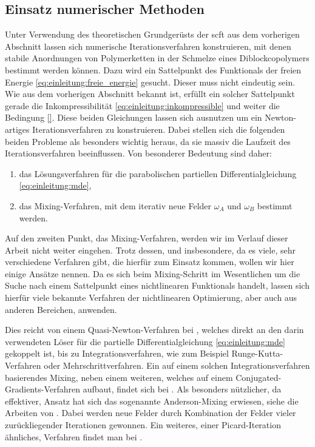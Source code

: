 \subsection*{Einsatz numerischer Methoden} %

Unter Verwendung des theoretischen Grundgerüsts der \ac{scft} aus dem vorherigen Abschnitt lassen sich numerische Iterationsverfahren konstruieren, mit denen stabile Anordnungen von Polymerketten in der Schmelze eines Diblockcopolymers bestimmt werden können.
Dazu wird ein Sattelpunkt des Funktionals der freien Energie \eqref{eq:einleitung:freie_energie} gesucht.
Dieser muss nicht eindeutig sein.
Wie aus dem vorherigen Abschnitt bekannt ist, erfüllt ein solcher Sattelpunkt gerade die Inkompressibilität \eqref{eq:einleitung:inkompressible} und weiter die Bedingung \eqref{}.
Diese beiden Gleichungen lassen sich ausnutzen um ein Newton-artiges Iterationsverfahren zu konstruieren.
Dabei stellen sich die folgenden beiden Probleme als besonders wichtig heraus, da sie massiv die Laufzeit des Iterationsverfahren beeinflussen.
Von besonderer Bedeutung sind daher:
\begin{enumerate}[label={\itshape\roman*.}]
    \item das Lösungsverfahren für die parabolischen partiellen Differentialgleichung \eqref{eq:einleitung:mde},
    \item das Mixing-Verfahren, mit dem iterativ neue Felder $\omega_{A}$ und $\omega_{B}$ bestimmt werden.
\end{enumerate}

Auf den zweiten Punkt, das Mixing-Verfahren, werden wir im Verlauf dieser Arbeit nicht weiter eingehen.
Trotz dessen, und insbesondere, da es viele, sehr verschiedene Verfahren gibt, die hierfür zum Einsatz kommen, wollen wir hier einige Ansätze nennen.
Da es sich beim Mixing-Schritt im Wesentlichen um die Suche nach einem Sattelpunkt eines nichtlinearen Funktionals handelt, lassen sich hierfür viele bekannte Verfahren der nichtlinearen Optimierung, aber auch aus anderen Bereichen, anwenden.

Dies reicht von einem Quasi-Newton-Verfahren bei \textcite{Matsen:1994bz}, welches direkt an den darin verwendeten Löser für die partielle Differentialgleichung \eqref{eq:einleitung:mde} gekoppelt ist, bis zu Integrationsverfahren, wie zum Beispiel Runge-Kutta-Verfahren oder Mehrschrittverfahren.
Ein auf einem solchen Integrationsverfahren basierendes Mixing, neben einem weiteren, welches auf einem Conjugated-Gradients-Verfahren aufbaut, findet sich bei \textcite{Ceniceros:2006is}.
Als besonders nützlicher, da effektiver, Ansatz hat sich das sogenannte Anderson-Mixing erwiesen, siehe die Arbeiten von \textcite{Thompson:2004um,Stasiak:2011ba}.
Dabei werden neue Felder durch Kombination der Felder vieler zurückliegender Iterationen gewonnen.
Ein weiteres, einer Picard-Iteration ähnliches, Verfahren findet man bei \textcite{Drolet:1999bs}.

